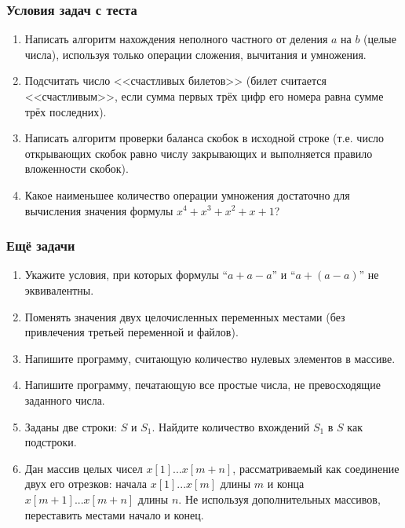 \documentclass[xetex,mathserif,serif]{beamer}
\begin{document}
    \begin{frame}
        \frametitle{Условия задач с теста}
        \begin{enumerate}
            \item Написать алгоритм нахождения неполного частного от деления $a$ на $b$ (целые числа), используя только операции сложения, вычитания и умножения.
            \item Подсчитать число <<счастливых билетов>> (билет считается <<счастливым>>, если сумма первых трёх цифр его номера равна сумме трёх последних).
            \item Написать алгоритм проверки баланса скобок в исходной строке (т.е. число открывающих скобок равно числу закрывающих и выполняется правило вложенности скобок).
            \item Какое наименьшее количество операции умножения достаточно для вычисления значения формулы $x^4 + x^3 + x^2 + x + 1$?
        \end{enumerate}
    \end{frame}

    \begin{frame}
        \frametitle{Ещё задачи}
        \begin{enumerate}
            \item Укажите условия, при которых формулы ``$a + a - a$'' и ``$a + (a - a)$'' не эквивалентны.
            \item Поменять значения двух целочисленных переменных местами (без привлечения третьей переменной и файлов).
            \item Напишите программу, считающую количество нулевых элементов в массиве.
            \item Напишите программу, печатающую все простые числа, не превосходящие заданного числа.
            \item Заданы две строки: $S$ и $S_1$. Найдите количество вхождений $S_1$ в $S$ как подстроки.
            \item Дан массив целых чисел $x[1]...x[m+n]$, рассматриваемый как соединение двух его отрезков: начала $x[1]...x[m]$ длины $m$ и конца $x[m+1]...x[m+n]$ длины $n$. Не используя дополнительных массивов, переставить местами начало и конец.
        \end{enumerate}
    \end{frame}
\end{document}

